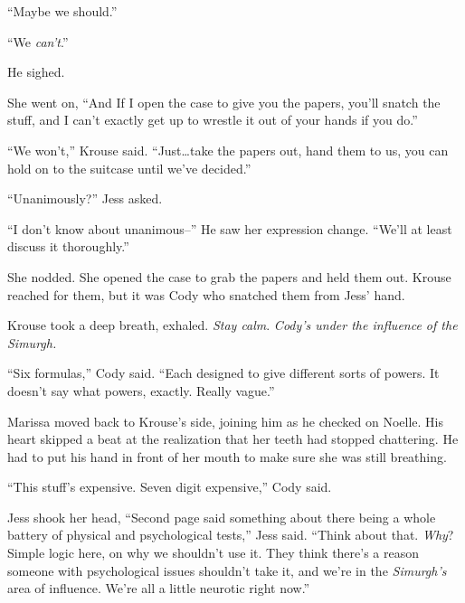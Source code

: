 ``Maybe we should.''



``We \emph{can't}.''



He sighed.



She went on, ``And If I open the case to give you the papers, you'll snatch the stuff, and I can't exactly get up to wrestle  it out of your hands if you do.''



``We won't,'' Krouse said.  ``Just\ldots take the papers out, hand them to us, you can hold on to the suitcase until we've decided.''



``Unanimously?'' Jess asked.



``I don't know about unanimous--'' He saw her expression change.  ``We'll at least discuss it thoroughly.''



She nodded.  She opened the case to grab the papers and held them out.  Krouse reached for them, but it was Cody who snatched them from Jess' hand.



Krouse took a deep breath, exhaled.  \emph{Stay calm}.  \emph{Cody's under the influence of the Simurgh.}



``Six formulas,'' Cody said.  ``Each designed to give different sorts of powers.  It doesn't say what powers, exactly.  Really vague.''



Marissa moved back to Krouse's side, joining him as he checked on Noelle.  His heart skipped a beat at the realization that her teeth had stopped chattering.  He had to put his hand in front of her mouth to make sure she was still breathing.



``This stuff's expensive.  Seven digit expensive,'' Cody said.



Jess shook her head, ``Second page said something about there being a whole battery of physical and psychological tests,'' Jess said.  ``Think about that.  \emph{Why}?  Simple logic here, on why we shouldn't use it.  They think there's a reason someone with psychological issues shouldn't take it, and we're in the \emph{Simurgh's} area of influence.  We're all a little neurotic right now.''



